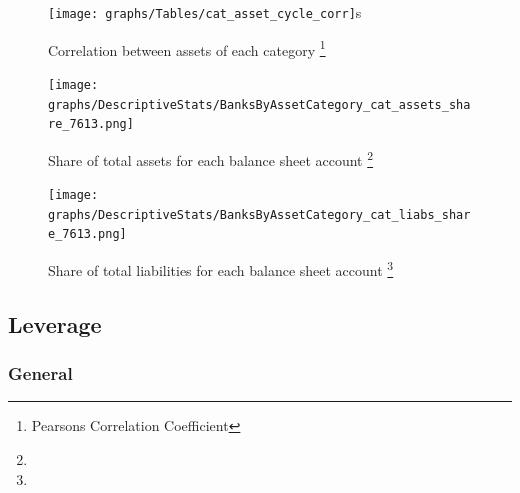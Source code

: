 \documentclass[12pt, a4paper]{article} %
\begin{document}
\begin{figure}[hbtp]
\begin{minipage}{\textwidth}
\centering
\caption[1]{Correlation between assets of each category \footnote{Pearsons Correlation Coefficient} }
\texttt{[image: graphs/Tables/cat\_asset\_cycle\_corr]}s
\label{table:cat_assets_corr}
\end{minipage}
\end{figure}


\begin{figure}[hbtp]
\begin{minipage}{\textwidth}
\centering
\caption[1]{Share of total assets for each balance sheet account \footnote{} }
\texttt{[image: graphs/DescriptiveStats/BanksByAssetCategory\_cat\_assets\_share\_7613.png]}
\label{fig:catAssetsShare}
\end{minipage}
\end{figure}


\begin{figure}[hbtp]
\begin{minipage}{\textwidth}
\centering
\caption[1]{Share of total liabilities for each balance sheet account \footnote{} }
\texttt{[image: graphs/DescriptiveStats/BanksByAssetCategory\_cat\_liabs\_share\_7613.png]}
\label{fig:catLiabShare}
\end{minipage}
\end{figure}

\newpage


\subsection{Leverage}

\subsubsection{General}
\end{document}

